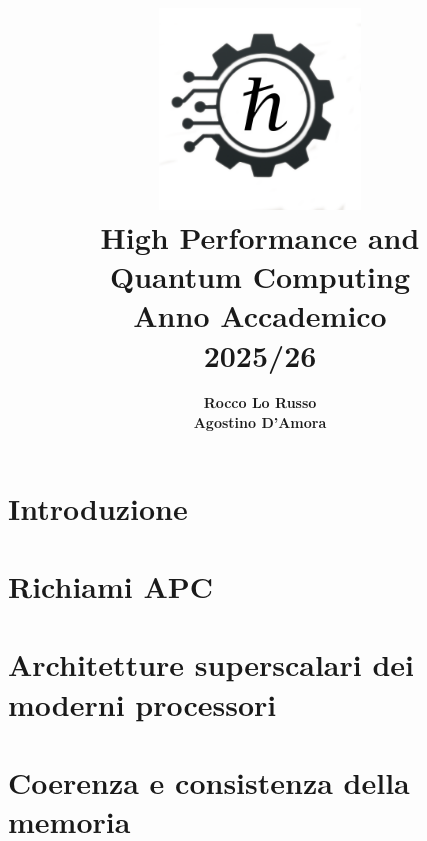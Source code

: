 \documentclass[a4paper,12pt, openany]{extbook}
\title{
    \includegraphics[width=0.4\textwidth]{fig/h_tagliato.png} \\ %
    \vspace{1cm}
    \Huge{High Performance and\\Quantum Computing} \\
    \vspace{0.5cm} 
    \Large{Anno Accademico\\2025/26}
}
\author{\textbf{Rocco Lo Russo}\\\textbf{Agostino D'Amora}} %
\date{}
\begin{document}
\maketitle

\tableofcontents
\newpage

\chapter*{Introduzione}


\chapter{Richiami APC} \label{chap:richiami_apc}





\chapter{Architetture superscalari dei moderni processori} \label{chap:architetture_superscalari}






\chapter{Coerenza e consistenza della memoria}



\end{document}
